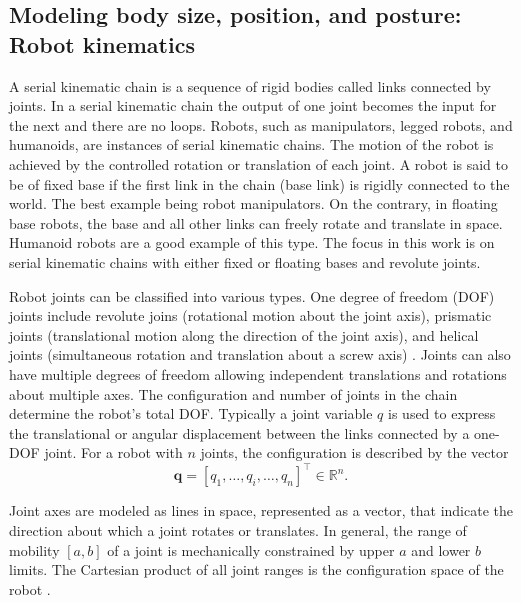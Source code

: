 \subsection{Modeling body size, position, and posture: Robot kinematics}
A serial kinematic chain is a sequence of rigid bodies called links connected by joints. In a serial kinematic chain the output of one joint becomes the input for the next and there are no loops. Robots, such as manipulators, legged robots, and humanoids, are instances of serial kinematic chains. The motion of the robot is achieved by the controlled rotation or translation of each joint.  A robot is said to be of fixed base if the first link in the chain (base link) is rigidly connected to the world. The best example being robot manipulators. On the contrary, in floating base robots, the base and all other links can freely rotate and translate in space. Humanoid robots are a good example of this type. The focus in this work is on serial kinematic chains with either fixed or floating bases and revolute joints. %

Robot joints can be classified into various types. One degree of freedom (DOF) joints include revolute joins (rotational motion about the joint axis), prismatic joints (translational motion along the direction of the joint axis), and  helical joints (simultaneous rotation and translation about a screw axis) \cite{Lynch2017Modernrobotics}. Joints can also have multiple degrees of freedom allowing independent translations and rotations about multiple axes. The configuration and number of joints in the chain determine the robot's total DOF. Typically a joint variable $q$ is used to express the translational or angular displacement between the links connected by a one-DOF joint. %
For a robot with $n$ joints, the configuration is described by the vector 
\begin{equation}
	\bm{q} = [q_1,\ldots,q_i,\ldots,q_n]^\intercal \in \mathbb{R}^n.
\end{equation}

Joint axes are modeled as lines in space, represented as a vector, that indicate the direction about which a joint rotates or translates. In general, the range of mobility $\left[a,b\right] $ of a joint is mechanically constrained by upper $a$ and lower $b$ limits. The Cartesian product of all joint ranges is the configuration space of the robot \cite{Lynch2017Modernrobotics}.

